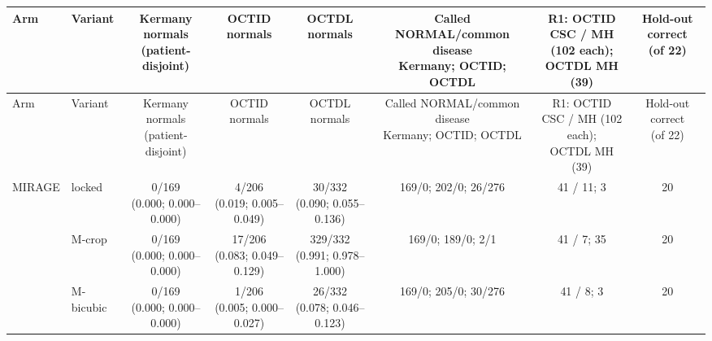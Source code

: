 \begin{longtable}{@{}llcccccc@{}}
\toprule
Arm & Variant & \makecell{Kermany normals\\(patient-disjoint)} & OCTID normals & OCTDL normals & \makecell{Called NORMAL/common disease\\Kermany; OCTID; OCTDL} & \makecell{R1: OCTID\\CSC / MH (102 each);\\OCTDL MH (39)} & \makecell{Hold-out correct\\(of 22)} \\
\midrule
\endfirsthead
\toprule
Arm & Variant & \makecell{Kermany normals\\(patient-disjoint)} & OCTID normals & OCTDL normals & \makecell{Called NORMAL/common disease\\Kermany; OCTID; OCTDL} & \makecell{R1: OCTID\\CSC / MH (102 each);\\OCTDL MH (39)} & \makecell{Hold-out correct\\(of 22)} \\
\midrule
\endhead
\bottomrule
\endfoot
\bottomrule
\endlastfoot
MIRAGE & locked & \makecell{0/169\\{\scriptsize (0.000; 0.000--0.000)}} & \makecell{4/206\\{\scriptsize (0.019; 0.005--0.049)}} & \makecell{30/332\\{\scriptsize (0.090; 0.055--0.136)}} & 169/0; 202/0; 26/276 & 41 / 11; 3 & 20 \\
 & M-crop & \makecell{0/169\\{\scriptsize (0.000; 0.000--0.000)}} & \makecell{17/206\\{\scriptsize (0.083; 0.049--0.129)}} & \makecell{329/332\\{\scriptsize (0.991; 0.978--1.000)}} & 169/0; 189/0; 2/1 & 41 / 7; 35 & 20 \\
 & M-bicubic & \makecell{0/169\\{\scriptsize (0.000; 0.000--0.000)}} & \makecell{1/206\\{\scriptsize (0.005; 0.000--0.027)}} & \makecell{26/332\\{\scriptsize (0.078; 0.046--0.123)}} & 169/0; 205/0; 30/276 & 41 / 8; 3 & 20 \\

\end{longtable}
